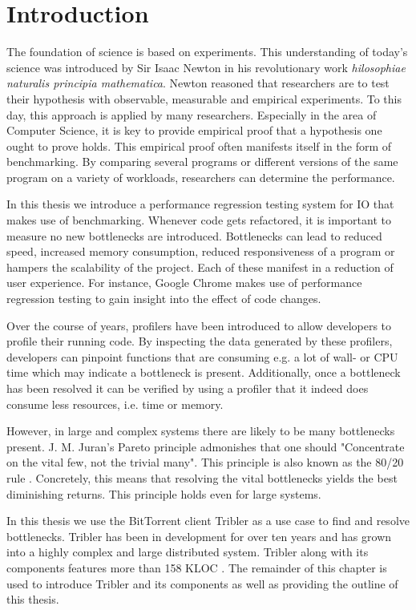 \chapter{Introduction}
\label{chp:introduction}

The foundation of science is based on experiments.
This understanding of today's science was introduced by Sir Isaac Newton in his revolutionary work \emph{hilosophiae naturalis principia mathematica}.
Newton reasoned that researchers are to test their hypothesis with observable, measurable and empirical experiments.
To this day, this approach is applied by many researchers.
Especially in the area of Computer Science, it is key to provide empirical proof that a hypothesis one ought to prove holds.
This empirical proof often manifests itself in the form of benchmarking.
By comparing several programs or different versions of the same program on a variety of workloads, researchers can determine the performance.

In this thesis we introduce a performance regression testing system for IO that makes use of benchmarking.
Whenever code gets refactored, it is important to measure no new bottlenecks are introduced.
Bottlenecks can lead to reduced speed, increased memory consumption, reduced responsiveness of a program or hampers the scalability of the project.
Each of these manifest in a reduction of user experience.
For instance, Google Chrome makes use of performance regression testing to gain insight into the effect of code changes.

Over the course of years, profilers have been introduced to allow developers to profile their running code.
By inspecting the data generated by these profilers, developers can pinpoint functions that are consuming e.g. a lot of wall- or CPU time which may indicate a bottleneck is present.
Additionally, once a bottleneck has been resolved it can be verified by using a profiler that it indeed does consume less resources, i.e. time or memory.

However, in large and complex systems there are likely to be many bottlenecks present.
J. M. Juran's Pareto principle admonishes that one should "Concentrate on the vital few, not the trivial many". This principle is also known as the 80/20 rule \cite{ammons2004finding}.
Concretely, this means that resolving the vital bottlenecks yields the best diminishing returns.
This principle holds even for large systems.

In this thesis we use the BitTorrent client Tribler as a use case to find and resolve bottlenecks.
Tribler has been in development for over ten years and has grown into a highly complex and large distributed system.
Tribler along with its components features more than 158 KLOC \cite{tribler2015about}.
The remainder of this chapter is used to introduce Tribler and its components as well as providing the outline of this thesis.

